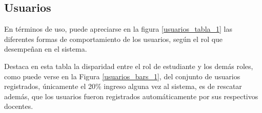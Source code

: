 \subsection{Usuarios}
En términos de uso, puede apreciarse en la figura \ref{usuarios_tabla_1} las
diferentes formas de comportamiento de los usuarios, según el rol que desempeñan
en el sistema.


Destaca en esta tabla la disparidad entre el rol de estudiante y los demás
roles, como puede verse en la Figura \ref{usuarios_bars_1}, del conjunto de
usuarios registrados, únicamente el 20\% ingreso alguna vez al sistema, es de
rescatar además, que los usuarios fueron registrados automáticamente por sus
respectivos docentes.






